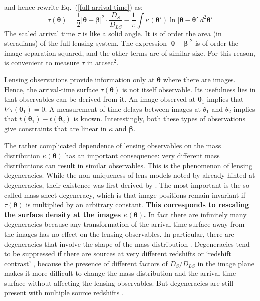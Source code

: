 \documentclass[galley,usenatbib]{mn2e}
\renewcommand{\vec}[1]{\ensuremath{\boldsymbol{#1}}}
\newcommand{\hilight}[1]{{\bf \color{OliveGreen} #1}}
\newcommand{\eqnref}[1] {Eq.~(\ref{#1})}
\begin{document}
%
and hence rewrite \eqnref{full arrival time} as:
%
\begin{equation}
\tau(\vec\theta) = {\textstyle\frac12} |\vec\theta - \vec\beta|^2
                   \cdot \frac{D_{S}}{D_{LS}}
                 - \frac1\pi \int \kappa (\vec\theta')
                   \ln|\vec\theta - \vec\theta'| d^2\vec\theta'
\label{arrival time}
\end{equation}
%
The scaled arrival time $\tau$ is like a solid angle. It is of order the area
(in steradians) of the full lensing system. The expression $|\vec\theta -
\vec\beta|^2$ is of order the image-separation squared, and the other terms are
of similar size.  For this reason, is convenient to measure $\tau$ in
arcsec$^{2}$.

Lensing observations provide information only at $\vec\theta$ where there are
images.  Hence, the arrival-time surface $\tau(\vec\theta)$ is not itself
observable.  Its usefulness lies in that observables can be derived from it.
An image observed at $\vec\theta_1$ implies that $\nabla\tau(\vec\theta_1)=0$.
A measurement of time delays between images at $\theta_1$ and $\theta_2$
implies that $t(\vec\theta_1)-t(\vec\theta_2)$ is known.  Interestingly, both
these types of observations give constraints that are linear in $\kappa$ and
$\vec\beta$.

The rather complicated dependence of lensing observables on the mass
distribution $\kappa(\vec\theta)$ has an important consequence: very different
mass distributions can result in similar observables.  This is the phenomenon
of lensing degeneracies.  While the non-uniqueness of lens models noted by
\cite{1981ApJ...244..736Y} already hinted at degeneracies, their existence was
first derived by \cite{1985ApJ...289L...1F}.  The most important is the
so-called mass-sheet degeneracy, which is that image positions remain invariant
if $\tau(\vec\theta)$ is multiplied by an arbitrary constant.  
\hilight{This corresponds
to rescaling the surface density at the images $\kappa(\vec\theta)$.} In fact
there are infinitely many degeneracies \citep{2000AJ....120.1654S} because any
transformation of the arrival-time surface away from the images has no effect
on the lensing observables.  In particular, there are degeneracies that involve
the shape of the mass distribution
\citep{2006ApJ...653..936S,2013arXiv1306.4675S}.  Degeneracies tend to be
suppressed if there are sources at very different redshifts or `redshift
contrast' \citep{1998AJ....116.1541A,2009ApJ...690..154S}, because the presence
of different factors of $D_S/D_{LS}$ in the image plane makes it more difficult
to change the mass distribution and the arrival-time surface without affecting
the lensing observables. But degeneracies are still present with multiple
source redshifts \citep{2008MNRAS.386..307L,2014arXiv1406.6152S}.
\end{document}
